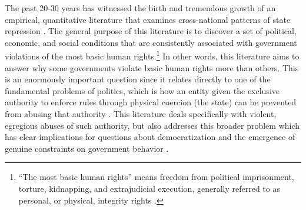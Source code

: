 \documentclass[11pt]{article}
\begin{document}
The past 20-30 years has witnessed the birth and tremendous growth of an empirical, quantitative literature that examines cross-national patterns of state repression \citep[See, e.g.,][]{Hibbs1973,Stohletal1986, Park1987, McCormickMitchell1988, Henderson1991, Henderson1993, PoeTate1994, Davenport1995, Fein1995, Davenport1999, CingranelliRichards1999isq, Keith1999, Poeetal1999, Apodaca2001, RichardsGellenySacko2001,  Hathaway2002, Keith2002PRQ, DavenportArmstrong2004, BDMetal2005, HafnerBurton2005jpr, HafnerBurtonTsutsui2005, Davenport2007AR, Davenport2007, KeithTatePoe2009, CingranelliFilippov2010, ConradMoore2010}. The general purpose of this literature is to discover a set of political, economic, and social conditions that are consistently associated with government violations of the most basic human rights.\footnote{``The most basic human rights'' means freedom from political imprisonment, torture, kidnapping, and extrajudicial execution, generally referred to as personal, or physical, integrity rights \citep[See, e.g.][]{PoeTate1994, CingranelliRichards1999isq}.} In other words, this literature aims to answer why some governments violate basic human rights more than others. This is an enormously important question since it relates directly to one of the fundamental problems of politics, which is how an entity given the exclusive authority to enforce rules through physical coercion (the state) can be prevented from abusing that authority \citep[See, e.g.,][]{Moore2010}. This literature deals specifically with violent, egregious abuses of such authority, but also addresses this broader problem which has clear implications for questions about democratization and the emergence of genuine constraints on government behavior \citep[E.g.,][]{NorthWeingast1989,Weingast1997}.
\end{document}
